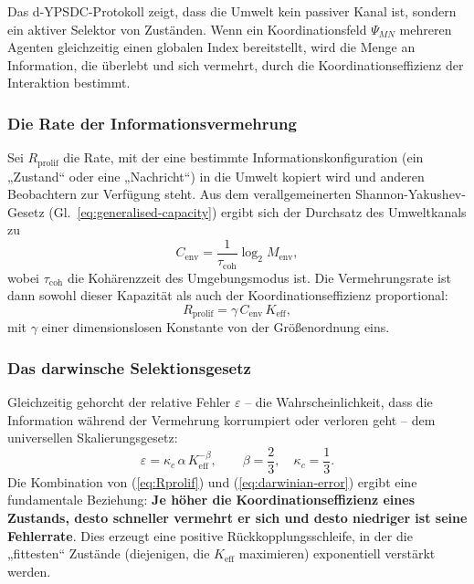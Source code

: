 \documentclass[12pt,a4paper]{article}
\theoremstyle{remark}
\begin{document}
	Das d-YPSDC-Protokoll zeigt, dass die Umwelt kein passiver Kanal ist, sondern ein aktiver Selektor von Zuständen. Wenn ein Koordinationsfeld \(\Psi_{MN}\) mehreren Agenten gleichzeitig einen globalen Index bereitstellt, wird die Menge an Information, die überlebt und sich vermehrt, durch die Koordinationseffizienz der Interaktion bestimmt.
	
	\subsubsection*{Die Rate der Informationsvermehrung}
	Sei \(R_{\mathrm{prolif}}\) die Rate, mit der eine bestimmte Informationskonfiguration (ein „Zustand“ oder eine „Nachricht“) in die Umwelt kopiert wird und anderen Beobachtern zur Verfügung steht. Aus dem verallgemeinerten Shannon-Yakushev-Gesetz (Gl.~\ref{eq:generalised-capacity}) ergibt sich der Durchsatz des Umweltkanals zu
	\[
	C_{\mathrm{env}} = \frac{1}{\tau_{\mathrm{coh}}} \log_2 M_{\mathrm{env}},
	\]
	wobei \(\tau_{\mathrm{coh}}\) die Kohärenzzeit des Umgebungsmodus ist. Die Vermehrungsrate ist dann sowohl dieser Kapazität als auch der Koordinationseffizienz proportional:
	\begin{equation}
		R_{\mathrm{prolif}} = \gamma \, C_{\mathrm{env}} \, K_{\mathrm{eff}},
		\label{eq:Rprolif}
	\end{equation}
	mit \(\gamma\) einer dimensionslosen Konstante von der Größenordnung eins.
	
	\subsubsection*{Das darwinsche Selektionsgesetz}
	Gleichzeitig gehorcht der relative Fehler \(\varepsilon\) – die Wahrscheinlichkeit, dass die Information während der Vermehrung korrumpiert oder verloren geht – dem universellen Skalierungsgesetz:
	\begin{equation}
		\varepsilon = \kappa_c \, \alpha \, K_{\mathrm{eff}}^{-\beta},
		\qquad \beta = \frac{2}{3},\quad \kappa_c = \frac{1}{3}.
		\label{eq:darwinian-error}
	\end{equation}
	Die Kombination von (\ref{eq:Rprolif}) und (\ref{eq:darwinian-error}) ergibt eine fundamentale Beziehung: \textbf{Je höher die Koordinationseffizienz eines Zustands, desto schneller vermehrt er sich und desto niedriger ist seine Fehlerrate}. Dies erzeugt eine positive Rückkopplungsschleife, in der die „fittesten“ Zustände (diejenigen, die \(K_{\mathrm{eff}}\) maximieren) exponentiell verstärkt werden.
	
\end{document}
